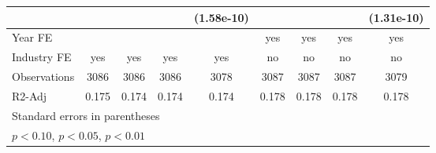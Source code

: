 \begin{table}[htbp]
\begin{tabular}{l*{8}{c}}
                    &                     &                     &                     &  (1.58e-10)         &                     &                     &                     &  (1.31e-10)         \\
\hline
Year FE             &                     &                     &                     &                     &         yes         &         yes         &         yes         &         yes         \\
Industry FE         &         yes         &         yes         &         yes         &         yes         &          no         &          no         &          no         &          no         \\
Observations        &        3086         &        3086         &        3086         &        3078         &        3087         &        3087         &        3087         &        3079         \\
R2-Adj              &       0.175         &       0.174         &       0.174         &       0.174         &       0.178         &       0.178         &       0.178         &       0.178         \\
\hline\hline
\multicolumn{9}{l}{\footnotesize Standard errors in parentheses}\\
\multicolumn{9}{l}{\footnotesize \sym{*} \(p<0.10\), \sym{**} \(p<0.05\), \sym{***} \(p<0.01\)}\\
\end{tabular}
\end{table}
